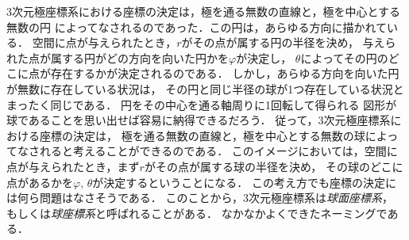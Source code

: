 3次元極座標系における座標の決定は，極を通る無数の直線と，極を中心とする無数の円
によってなされるのであった．この円は，あらゆる方向に描かれている．
空間に点が与えられたとき，$r$がその点が属する円の半径を決め，
与えられた点が属する円がどの方向を向いた円かを$\varphi$が決定し，
$\theta$によってその円のどこに点が存在するかが決定されるのである．
しかし，あらゆる方向を向いた円が無数に存在している状況は，
その円と同じ半径の球が1つ存在している状況とまったく同じである．
円をその中心を通る軸周りに1回転して得られる
図形が球であることを思い出せば容易に納得できるだろう．
従って，3次元極座標系における座標の決定は，
極を通る無数の直線と，極を中心とする無数の球によってなされると考えることができるのである．
このイメージにおいては，空間に点が与えられたとき，まず$r$がその点が属する球の半径を決め，
その球のどこに点があるかを$\varphi, \, \theta$が決定するということになる．
この考え方でも座標の決定には何ら問題はなさそうである．
このことから，3次元極座標系は\emph{球面座標系}，
もしくは\emph{球座標系}と呼ばれることがある．
なかなかよくできたネーミングである．

